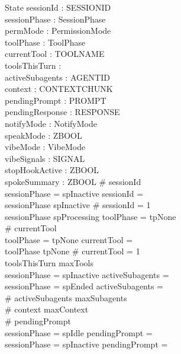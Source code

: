 \documentclass[a4paper,10pt,fleqn]{article}
\begin{document}
\begin{schema}{State}
  sessionId : \finset SESSIONID \\
  sessionPhase : SessionPhase \\
  permMode : PermissionMode \\
  toolPhase : ToolPhase \\
  currentTool : \finset TOOLNAME \\
  toolsThisTurn : \nat \\
  activeSubagents : \finset AGENTID \\
  context : \seq CONTEXTCHUNK \\
  pendingPrompt : \finset PROMPT \\
  pendingResponse : \finset RESPONSE \\
  notifyMode : NotifyMode \\
  speakMode : ZBOOL \\
  vibeMode : VibeMode \\
  vibeSignals : \finset SIGNAL \\
  stopHookActive : ZBOOL \\
  spokeSummary : ZBOOL
  \where
  \# sessionId  \\
  sessionPhase = spInactive \implies sessionId = \emptyset \\
  sessionPhase \neq spInactive \implies \# sessionId = 1 \\
  sessionPhase \neq spProcessing \implies toolPhase = tpNone \\
  \# currentTool  \\
  toolPhase = tpNone \implies currentTool = \emptyset \\
  toolPhase \neq tpNone \implies \# currentTool = 1 \\
  toolsThisTurn \leq maxTools \\
  sessionPhase = spInactive \implies activeSubagents = \emptyset \\
  sessionPhase = spEnded \implies activeSubagents = \emptyset \\
  \# activeSubagents \leq maxSubagents \\
  \# context \leq maxContext \\
  \# pendingPrompt  \\
  sessionPhase = spIdle \implies pendingPrompt = \emptyset \\
  sessionPhase = spInactive \implies pendingPrompt = \emptyset \\

\end{schema}
\end{document}
